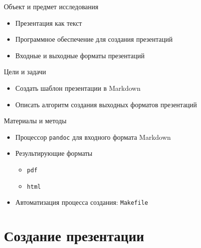 \documentclass[
  ignorenonframetext,
  aspectratio=169,
  russian,
]{beamer}
\providecommand{\tightlist}{%
  \setlength{\itemsep}{0pt}\setlength{\parskip}{0pt}}\usepackage{longtable,booktabs,array}
\begin{document}
\begin{frame}{Объект и предмет исследования}
\label{ux43eux431ux44aux435ux43aux442-ux438-ux43fux440ux435ux434ux43cux435ux442-ux438ux441ux441ux43bux435ux434ux43eux432ux430ux43dux438ux44f}
\begin{itemize}[<+->]
\tightlist
\item
  Презентация как текст
\item
  Программное обеспечение для создания презентаций
\item
  Входные и выходные форматы презентаций
\end{itemize}
\end{frame}

\begin{frame}{Цели и задачи}
\label{ux446ux435ux43bux438-ux438-ux437ux430ux434ux430ux447ux438}
\begin{itemize}[<+->]
\tightlist
\item
  Создать шаблон презентации в Markdown
\item
  Описать алгоритм создания выходных форматов презентаций
\end{itemize}
\end{frame}

\begin{frame}[fragile]{Материалы и методы}
\label{ux43cux430ux442ux435ux440ux438ux430ux43bux44b-ux438-ux43cux435ux442ux43eux434ux44b}
\begin{itemize}[<+->]
\tightlist
\item
  Процессор \texttt{pandoc} для входного формата Markdown
\item
  Результирующие форматы

  \begin{itemize}[<+->]
  \tightlist
  \item
    \texttt{pdf}
  \item
    \texttt{html}
  \end{itemize}
\item
  Автоматизация процесса создания: \texttt{Makefile}
\end{itemize}
\end{frame}

\section{Создание
презентации}\label{ux441ux43eux437ux434ux430ux43dux438ux435-ux43fux440ux435ux437ux435ux43dux442ux430ux446ux438ux438}
\end{document}
